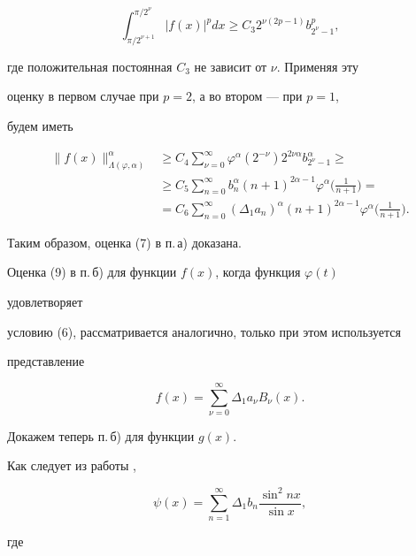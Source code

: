 $$


\int^{\pi/2^\nu}_{\pi/2^{\nu+1}}


|f(x)|^p dx\ge C_3 2^{\nu(2p-1)}


b^p_{2^\nu-1},


$$


где положительная постоянная $C_3$ не зависит от $\nu$. Применяя эту


оценку в первом случае при $p=2$, а во втором --- при $p=1$,


будем иметь


\begin{align*}


\|f(x)\|^\alpha_{\Lambda(\varphi,\alpha)}&\ge C_4


\sum^\infty_{\nu=0}\varphi^\alpha(2^{-\nu})2^{2\nu\alpha}


b^\alpha_{2^\nu-1} \ge \\


&\ge C_5\sum^\infty_{n=0}b^\alpha_n(n+1)^{2\alpha-1}\varphi^\alpha


\biggl(\frac{1}{n+1} \biggr)= \\


&=C_6\sum^\infty_{n=0}(\Delta_1a_n)^\alpha(n+1)^{2\alpha-1}


\varphi^\alpha\biggl(\frac{1}{n+1} \biggr).


\end{align*}


Таким образом, оценка (7) в п.\,а) доказана.





Оценка (9) в п.\,б) для функции $f(x)$, когда функция $\varphi(t)$


удовлетворяет


условию (6), рассматривается аналогично, только при этом используется


представление


$$


f(x)=\sum^\infty_{\nu=0}\Delta_1a_\nu B_\nu(x).


$$


Докажем теперь п.\,б) для функции $g(x)$.


Как следует из работы \cite{2},


$$


\psi(x)=\sum^\infty_{n=1}\Delta_1 b_n


\frac{\sin^2nx}{\sin x},


$$


где


$$



